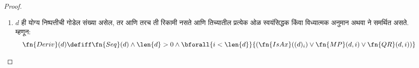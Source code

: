 \begin{proof}
\begin{enumerate}
  पुढील अटी पूर्ण झाल्या तर आणि तरच असे घडते:
  \begin{enumerate}
  \item एखादे वाक्य~$\psi$ असते (येथे हा विशेष प्रसंग;
    सर्वसाधारण नियमात सूत्रही चालते), आणि
  \item $x$ हाच मुक्त चल असू शकणारे सूत्र~$\varphi(x)$ असते, ज्यासाठी
  \item ओळ $i$ मध्ये $\psi \lif \lforall[x][\varphi(x)]$ असते,
  \item आधीच्या एखाद्या ओळीत, $j < i$, कोणत्यातरी अचर~$c$ साठी
    $\psi \lif \Subst{\varphi}{c}{x}$ असते,
  \item आणि हा अचर $\psi$ मध्ये येत नाही.
  \end{enumerate}
  या अटी आदिम पुनरावर्ती रीतीने तपासता येतात. कारण $\psi$,
  $\varphi(x)$ आणि $x$ यांच्या गोडेल संख्या $i$ व्या ओळीवरील
  सूत्राच्या गोडेल संख्येपेक्षा लहान आहेत; तसेच $c$ ची गोडेल
  संख्या $j$ व्या ओळीवरील सूत्राच्या गोडेल संख्येपेक्षा लहान आहे:
  \begin{multline*}
    \fn{QR}_1(d, i) \defiff \bexists{j<i}{\bexists{b < (d)_i}{\bexists{x <
        (d)_i}{\bexists{a < (d)_i}{\bexists{c < (d)_j}{(}}}}}
    \\ \fn{Var}(x) \land \fn{Const}(c) \land {} \\
    (d)_i = \Gn{(} \concat
    b \concat \Gn{\lif} \concat \Gn{\lforall} \concat x \concat a
    \concat \Gn{)} \land {}\\
    (d)_j = \Gn{(} \concat b \concat
    \Gn{\lif} \concat \fn{Subst}(a,c,x) \concat \Gn{)} \land {}\\ \fn{Frm}(b)
    \land \fn{Frm}(a) \land {} \bforall{k <
      \len{b}}{(b)_k \neq (c)_0})
  \end{multline*}
  येथे $c$ आणि $x$ यांना अचर आणि चल यांच्या पदरूपातील
  गोडेल संख्या मानले आहे (म्हणजे त्यांचे चिन्हसंकेतांक नाहीत).
  $x$ हा $\varphi(x)$ मधील आदेशनासाठीचा चल आहे;
  $\Subst{\varphi(x)}{c}{x}$ हे वाक्य आहे का ही मूळ
  वाक्यांपुरती तपासणी सर्वसाधारण संख्यक-नियमासाठी आवश्यक नाही.
  सूत्ररूपता तपासून, $\psi$ मधील प्रत्येक चिन्ह $c$ पेक्षा
  वेगळे आहे ही अट ठेवून $c$ हा $\psi$ मध्ये येत नाही,
  याची खात्री करतो.

  \QR{} ची दुसरी आवृत्ती सरावासाठी ठेवतो.
\item $d$ ही योग्य निष्पत्तीची गोडेल संख्या असेल, तर आणि
  तरच ती रिकामी नसते आणि तिच्यातील प्रत्येक ओळ स्वयंसिद्धक
  किंवा विध्यात्मक अनुमान अथवा \QR{} ने समर्थित असते. म्हणून:
  \[  \fn{Deriv}(d) \defiff \fn{Seq}(d) \land \len{d}>0 \land
  \bforall{i < \len{d}}{(\fn{IsAx}((d)_i) \lor
    \fn{MP}(d,i) \lor \fn{QR}(d, i))}
  \]
\end{enumerate}
\end{proof}


